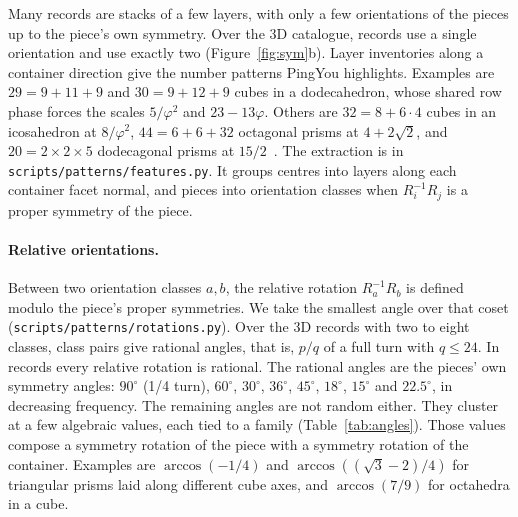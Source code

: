\documentclass[11pt,a4paper]{article}
\newcommand{\code}[1]{\texttt{\nolinkurl{#1}}}
\theoremstyle{definition}
\theoremstyle{remark}
\begin{document}
Many records are stacks of a few layers, with only a few orientations of the pieces up to the piece's own symmetry. Over the 3D catalogue, \nOneOrient{} records use a single orientation and \nTwoOrient{} use exactly two (Figure~\ref{fig:sym}b). Layer inventories along a container direction give the number patterns PingYou highlights. Examples are $29=9+11+9$ and $30=9+12+9$ cubes in a dodecahedron, whose shared row phase forces the scales $5/\varphi^2$ and $23-13\varphi$. Others are $32=8+6\cdot4$ cubes in an icosahedron at $8/\varphi^2$, $44=6+6+32$ octagonal prisms at $4+2\sqrt2$, and $20=2\times2\times5$ dodecagonal prisms at $15/2$~\cite{pingSixteen}. The extraction is in \code{scripts/patterns/features.py}. It groups centres into layers along each container facet normal, and pieces into orientation classes when $R_i^{-1}R_j$ is a proper symmetry of the piece.

\paragraph{Relative orientations.} Between two orientation classes $a,b$, the relative rotation $R_a^{-1}R_b$ is defined modulo the piece's proper symmetries. We take the smallest angle over that coset (\code{scripts/patterns/rotations.py}). Over the \nRotRecords{} 3D records with two to eight classes, \nRotPairs{} class pairs give \nRotRational{} rational angles, that is, $p/q$ of a full turn with $q\le24$. In \nRotAllRational{} records every relative rotation is rational. The rational angles are the pieces' own symmetry angles: $90^\circ$ (1/4 turn), $60^\circ$, $30^\circ$, $36^\circ$, $45^\circ$, $18^\circ$, $15^\circ$ and $22.5^\circ$, in decreasing frequency. The remaining angles are not random either. They cluster at a few algebraic values, each tied to a family (Table~\ref{tab:angles}). Those values compose a symmetry rotation of the piece with a symmetry rotation of the container. Examples are $\arccos(-1/4)$ and $\arccos((\sqrt3-2)/4)$ for triangular prisms laid along different cube axes, and $\arccos(7/9)$ for octahedra in a cube.
\end{document}
